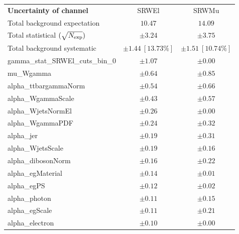 
\begin{table}
\begin{center}
\setlength{\tabcolsep}{0.0pc}
\begin{tabular*}{\textwidth}{@{\extracolsep{\fill}}lcc}
\noalign{\smallskip}\hline\noalign{\smallskip}
{\bf Uncertainty of channel}                                    & SRWEl            & SRWMu            \\
\noalign{\smallskip}\hline\noalign{\smallskip}
Total background expectation             &  $10.47$        &  $14.09$       \\
\noalign{\smallskip}\hline\noalign{\smallskip}
Total statistical $(\sqrt{N_{\rm exp}})$              & $\pm 3.24$        & $\pm 3.75$       \\
Total background systematic               & $\pm 1.44\ [13.73\%] $        & $\pm 1.51\ [10.74\%] $             \\
\noalign{\smallskip}\hline\noalign{\smallskip}
\noalign{\smallskip}\hline\noalign{\smallskip}
gamma\_stat\_SRWEl\_cuts\_bin\_0         & $\pm 1.07$          & $\pm 0.00$       \\
mu\_Wgamma         & $\pm 0.64$          & $\pm 0.85$       \\
alpha\_ttbargammaNorm         & $\pm 0.54$          & $\pm 0.66$       \\
alpha\_WgammaScale         & $\pm 0.43$          & $\pm 0.57$       \\
alpha\_WjetsNormEl         & $\pm 0.26$          & $\pm 0.00$       \\
alpha\_WgammaPDF         & $\pm 0.24$          & $\pm 0.32$       \\
alpha\_jer         & $\pm 0.19$          & $\pm 0.31$       \\
alpha\_WjetsScale         & $\pm 0.19$          & $\pm 0.16$       \\
alpha\_dibosonNorm         & $\pm 0.16$          & $\pm 0.22$       \\
alpha\_egMaterial         & $\pm 0.14$          & $\pm 0.01$       \\
alpha\_egPS         & $\pm 0.12$          & $\pm 0.02$       \\
alpha\_photon         & $\pm 0.11$          & $\pm 0.15$       \\
alpha\_egScale         & $\pm 0.11$          & $\pm 0.21$       \\
alpha\_electron         & $\pm 0.10$          & $\pm 0.00$       \\

\end{tabular*}
\end{center}
\end{table}
